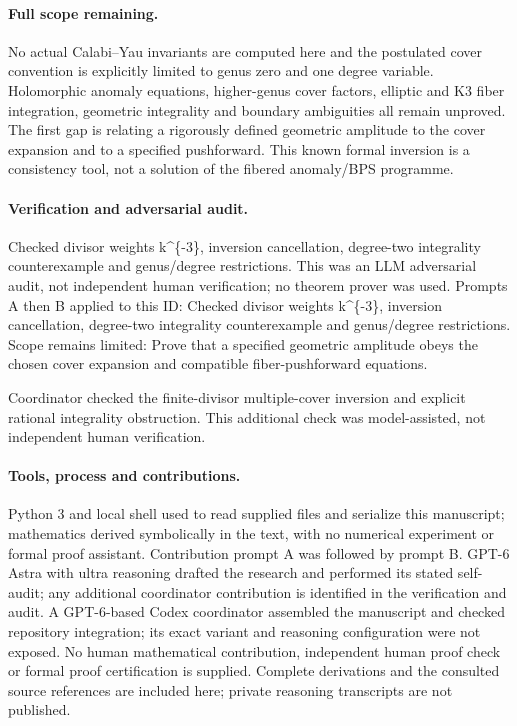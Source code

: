 \documentclass[11pt]{article}
\begin{document}
\paragraph{Full scope remaining.}No actual Calabi--Yau invariants are computed here and the postulated cover convention is explicitly limited to genus zero and one degree variable. Holomorphic anomaly equations, higher-genus cover factors, elliptic and K3 fiber integration, geometric integrality and boundary ambiguities all remain unproved. The first gap is relating a rigorously defined geometric amplitude to the cover expansion and to a specified pushforward. This known formal inversion is a consistency tool, not a solution of the fibered anomaly/BPS programme.

\paragraph{Verification and adversarial audit.}
Checked divisor weights k\textasciicircum{}\{-3\}, inversion cancellation, degree-two integrality counterexample and genus/degree restrictions. This was an LLM adversarial audit, not independent human verification; no theorem prover was used. Prompts A then B applied to this ID: Checked divisor weights k\textasciicircum{}\{-3\}, inversion cancellation, degree-two integrality counterexample and genus/degree restrictions. Scope remains limited: Prove that a specified geometric amplitude obeys the chosen cover expansion and compatible fiber-pushforward equations.

Coordinator checked the finite-divisor multiple-cover inversion and explicit rational integrality obstruction. This additional check was model-assisted, not independent human verification.

\paragraph{Tools, process and contributions.}
Python 3 and local shell used to read supplied files and serialize this manuscript; mathematics derived symbolically in the text, with no numerical experiment or formal proof assistant. Contribution prompt A was followed by prompt B. GPT-6 Astra with ultra reasoning drafted the research and performed its stated self-audit; any additional coordinator contribution is identified in the verification and audit. A GPT-6-based Codex coordinator assembled the manuscript and checked repository integration; its exact variant and reasoning configuration were not exposed. No human mathematical contribution, independent human proof check or formal proof certification is supplied. Complete derivations and the consulted source references are included here; private reasoning transcripts are not published.
\end{document}

